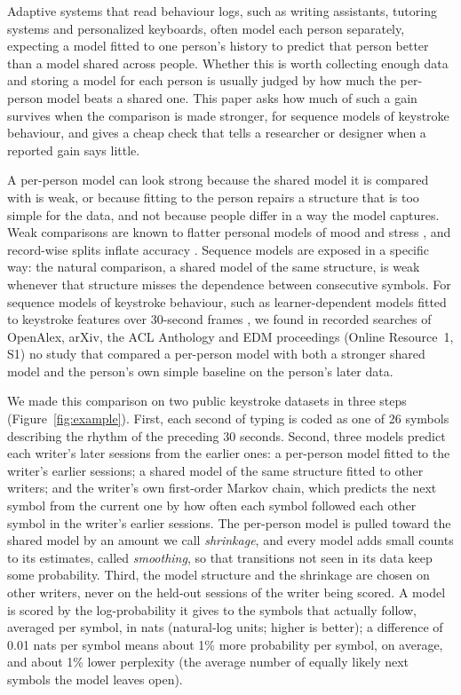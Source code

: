 \documentclass[pdflatex,sn-basic]{sn-jnl}
\newcommand{\Sref}[1]{Online Resource~1, S#1}
\begin{document}
Adaptive systems that read behaviour logs, such as writing assistants, tutoring systems and personalized keyboards, often model each person separately, expecting a model fitted to one person's history to predict that person better than a model shared across people. Whether this is worth collecting enough data and storing a model for each person is usually judged by how much the per-person model beats a shared one. This paper asks how much of such a gain survives when the comparison is made stronger, for sequence models of keystroke behaviour, and gives a cheap check that tells a researcher or designer when a reported gain says little.

A per-person model can look strong because the shared model it is compared with is weak, or because fitting to the person repairs a structure that is too simple for the data, and not because people differ in a way the model captures. Weak comparisons are known to flatter personal models of mood and stress \citep{DeMasi2017}, and record-wise splits inflate accuracy \citep{Saeb2017}. Sequence models are exposed in a specific way: the natural comparison, a shared model of the same structure, is weak whenever that structure misses the dependence between consecutive symbols. For sequence models of keystroke behaviour, such as learner-dependent models fitted to keystroke features over 30-second frames \citep{Uto2020}, we found in recorded searches of OpenAlex, arXiv, the ACL Anthology and EDM proceedings (\Sref{1}) no study that compared a per-person model with both a stronger shared model and the person's own simple baseline on the person's later data.

We made this comparison on two public keystroke datasets in three steps (Figure~\ref{fig:example}). First, each second of typing is coded as one of 26 symbols describing the rhythm of the preceding 30 seconds. Second, three models predict each writer's later sessions from the earlier ones: a per-person model fitted to the writer's earlier sessions; a shared model of the same structure fitted to other writers; and the writer's own first-order Markov chain, which predicts the next symbol from the current one by how often each symbol followed each other symbol in the writer's earlier sessions. The per-person model is pulled toward the shared model by an amount we call \emph{shrinkage}, and every model adds small counts to its estimates, called \emph{smoothing}, so that transitions not seen in its data keep some probability. Third, the model structure and the shrinkage are chosen on other writers, never on the held-out sessions of the writer being scored. A model is scored by the log-probability it gives to the symbols that actually follow, averaged per symbol, in nats (natural-log units; higher is better); a difference of 0.01 nats per symbol means about 1\% more probability per symbol, on average, and about 1\% lower perplexity (the average number of equally likely next symbols the model leaves open).
\end{document}
